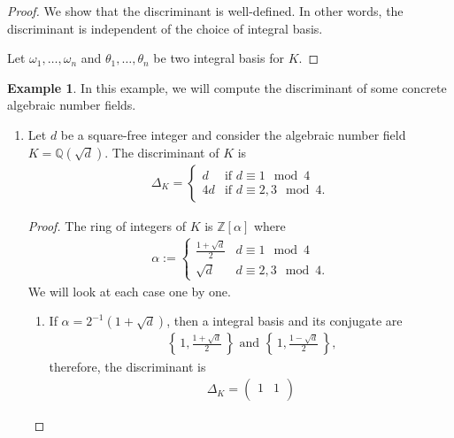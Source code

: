 \documentclass[a4paper]{book}
\theoremstyle{definition}
\newtheorem{example}{Example}[definition]
\newcommand{\set}[1]{\left\{\, #1 \,\right\}}
\begin{document}
\begin{proof}
    We show that the discriminant is well-defined. In other words, the discriminant is independent of the choice of integral basis.

    Let \(\omega_1, \ldots, \omega_n\) and \(\theta_1, \ldots, \theta_n\) be two integral basis for \(K\).
\end{proof}

\begin{example}
    In this example, we will compute the discriminant of some concrete algebraic number fields.
    \begin{enumerate}
        \item Let \(d\) be a square-free integer and consider the algebraic number field \(K = \mathbb{Q}(\sqrt{d})\). The discriminant of \(K\) is
        \begin{align*}
            \Delta_K = \begin{cases}
                d & \text{if \(d \equiv 1 \mod{4}\)}\\
                4d & \text{if \(d \equiv 2, 3 \mod{4}\).}
            \end{cases}
        \end{align*}
        \begin{proof}
            The ring of integers of \(K\) is \(\mathbb{Z}[\alpha]\) where
            \begin{align*}
                \alpha := \begin{cases}
                    \frac{1 + \sqrt{d}}{2} & d \equiv 1 \mod{4} \\
                    \sqrt{d} & d \equiv 2, 3 \mod{4} \text{.}
                \end{cases}
            \end{align*}
            We will look at each case one by one.
            \begin{enumerate}
                \item If \(\alpha = 2^{-1}(1 + \sqrt{d})\), then a integral basis and its conjugate are
                \begin{align*}
                    \set{1, \frac{1 + \sqrt{d}}{2}} \text{ and } \set{1, \frac{1 - \sqrt{d}}{2}} \text{,}
                \end{align*}
                therefore, the discriminant is
                \begin{align*}
                    \Delta_K = \begin{pmatrix}
                        1 & 1 \\

\end{pmatrix}
\end{align*}
\end{enumerate}
\end{proof}
\end{enumerate}
\end{example}
\end{document}
